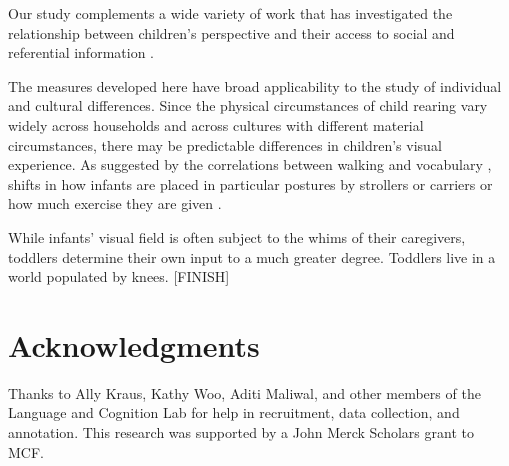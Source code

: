 \documentclass[10pt,letterpaper]{article}
\begin{document}
Our study complements a wide variety of work that has investigated the relationship between children's perspective and their access to social and referential information \cite{yoshida2008,franchak2011,smith2011,yuinpress,walleunderreview}. 

The measures developed here have broad applicability to the study of individual and cultural differences. Since the physical circumstances of child rearing vary widely across households and across cultures with different material circumstances, there may be predictable differences in children's visual experience. As suggested by the correlations between walking and vocabulary \cite{walleunderreview}, shifts in how infants are placed in particular postures by strollers or carriers \cite{zeedyk2008} or how much exercise they are given \cite{bril1986}.

While infants' visual field is often subject to the whims of their caregivers, toddlers determine their own input to a much greater degree. Toddlers live in a world populated by knees. [FINISH]


\section{Acknowledgments}

Thanks to Ally Kraus, Kathy Woo, Aditi Maliwal, and other members of the Language and Cognition Lab for help in recruitment, data collection, and annotation. This research was supported by a John Merck Scholars grant to MCF.



\setlength{\bibleftmargin}{.125in} \setlength{\bibindent}{-\bibleftmargin}


\end{document}
